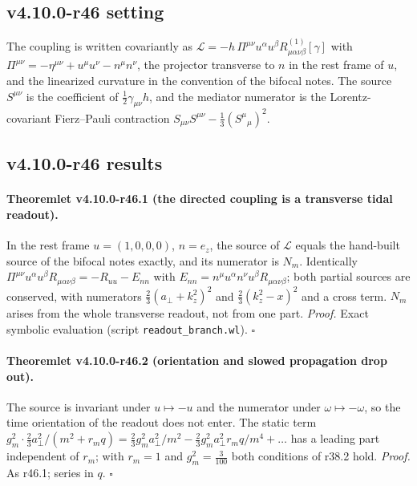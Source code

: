 \subsection*{v4.10.0-r46 setting}
\label{subsec:v4100-r46-setting}

The coupling is written covariantly as \(\mathcal L=-h\,\Pi^{\mu\nu}u^\alpha u^\beta R^{(1)}_{\mu\alpha\nu\beta}[\gamma]\) with \(\Pi^{\mu\nu}=-\eta^{\mu\nu}+u^\mu u^\nu-n^\mu n^\nu\), the projector
transverse to \(n\) in the rest frame of \(u\), and the linearized curvature in the convention of the bifocal notes.  The source \(S^{\mu\nu}\) is the coefficient
of \(\tfrac12\gamma_{\mu\nu}h\), and the mediator numerator is the Lorentz-covariant Fierz--Pauli contraction \(S_{\mu\nu}S^{\mu\nu}-\tfrac13(S^\mu{}_\mu)^2\).

\subsection*{v4.10.0-r46 results}
\label{subsec:v4100-r46-results}

\paragraph{Theoremlet v4.10.0-r46.1 (the directed coupling is a transverse tidal readout).}
In the rest frame \(u=(1,0,0,0)\), \(n=e_z\), the source of \(\mathcal L\) equals the hand-built source of the bifocal notes exactly, and its numerator is \(N_m\).
Identically \(\Pi^{\mu\nu}u^\alpha u^\beta R_{\mu\alpha\nu\beta}=-R_{uu}-E_{nn}\) with \(E_{nn}=n^\mu u^\alpha n^\nu u^\beta R_{\mu\alpha\nu\beta}\); both partial sources are conserved, with numerators
\(\tfrac23(a_\perp+k_z^2)^2\) and \(\tfrac23(k_z^2-x)^2\) and a cross term.  \(N_m\) arises from the whole transverse readout, not from one part.
\emph{Proof.} Exact symbolic evaluation (script \texttt{readout\_\allowbreak branch.wl}).  \(\square\)

\paragraph{Theoremlet v4.10.0-r46.2 (orientation and slowed propagation drop out).}
The source is invariant under \(u\mapsto-u\) and the numerator under \(\omega\mapsto-\omega\), so the time orientation of the readout does not enter.  The static
term \(g_m^2\cdot\tfrac23a_\perp^2/(m^2+r_mq)=\tfrac23g_m^2a_\perp^2/m^2-\tfrac23g_m^2a_\perp^2r_mq/m^4+\dots\) has a leading part independent of \(r_m\); with \(r_m=1\) and
\(g_m^2=\tfrac3{100}\) both conditions of r38.2 hold.
\emph{Proof.} As r46.1; series in \(q\).  \(\square\)

